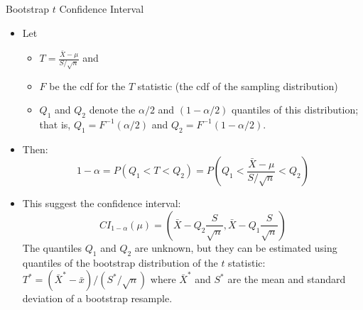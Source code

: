 \documentclass[
  ignorenonframetext,
]{beamer}
\providecommand{\tightlist}{%
  \setlength{\itemsep}{0pt}\setlength{\parskip}{0pt}}
\begin{document}
\begin{frame}{Bootstrap \(t\) Confidence Interval}
\protect\hypertarget{bootstrap-t-confidence-interval-9}{}
\begin{itemize}
\item
  Let

  \begin{itemize}
  \tightlist
  \item
    \(T=\frac{\bar{X}-\mu}{S/\sqrt{n}}\) and
  \item
    \(F\) be the cdf for the \(T\) statistic (the cdf of the sampling
    distribution)
  \item
    \(Q_1\) and \(Q_2\) denote the \(\alpha/2\) and \((1-\alpha/2)\)
    quantiles of this distribution; that is, \(Q_1=F^{-1}(\alpha/2)\)
    and \(Q_2=F^{-1}(1-\alpha/2)\).
  \end{itemize}
\item
  Then:
  \[1-\alpha=P(Q_1<T<Q_2)=P\left(Q_1<\frac{\bar{X}-\mu}{S/\sqrt{n}}<Q_2\right)\]
\item
  This suggest the confidence interval:
  \[CI_{1-\alpha}(\mu)=\left(\bar{X}-Q_2\frac{S}{\sqrt{n}},\bar{X}-Q_1\frac{S}{\sqrt{n}}\right)\]
  \tiny The quantiles \(Q_1\) and \(Q_2\) are unknown, but they can be
  estimated using quantiles of the bootstrap distribution of the \(t\)
  statistic: \(T^*=(\bar{X}^*-\bar{x})/(S^*/\sqrt{n})\) where
  \(\bar{X}^*\) and \(S^*\) are the mean and standard deviation of a
  bootstrap resample. \normalsize
\end{itemize}
\end{frame}
\end{document}
